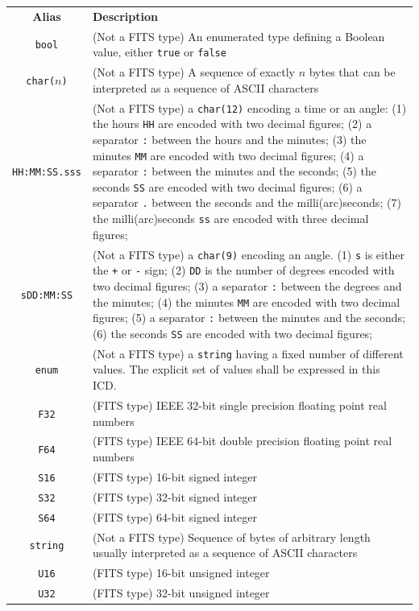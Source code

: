 \documentclass[panstarrs,spec]{panstarrs}
\begin{document}
{\centering%
  \begin{longtable}{|cp{5in}|}
    \hline
    \textbf{Alias} & \textbf{Description} \\
    \texttt{bool} & (Not a FITS type) An enumerated type defining a Boolean
    value, either \texttt{true} or \texttt{false}\\
    \texttt{char($n$)} & (Not a FITS type) A sequence of exactly $n$ bytes that
    can be interpreted
    as a sequence of ASCII characters\\
    \texttt{HH:MM:SS.sss} & (Not a FITS type) a \texttt{char(12)} encoding
    a time or an angle: (1) the hours \texttt{HH} are encoded with two
    decimal figures; (2) a separator \texttt{:} between the hours and
    the minutes; (3) the minutes \texttt{MM} are encoded with two
    decimal figures; (4) a separator \texttt{:} between the minutes
    and the seconds; (5) the seconds \texttt{SS} are encoded with two
    decimal figures; (6) a separator \texttt{.} between the seconds
    and the milli(arc)seconds; (7)
    the milli(arc)seconds \texttt{ss} are encoded with three decimal figures; \\
    \texttt{sDD:MM:SS} & (Not a FITS type) a \texttt{char(9)} encoding an
    angle. (1) \texttt{s} is either the \texttt{+} or \texttt{-} sign;
    (2) \texttt{DD} is the number of degrees encoded with two decimal
    figures; (3) a separator \texttt{:} between the degrees and the
    minutes; (4) the minutes \texttt{MM} are encoded with two decimal
    figures; (5) a separator \texttt{:} between the minutes and the
    seconds; (6) the
    seconds \texttt{SS} are encoded with two decimal figures;\\
    \texttt{enum} & (Not a FITS type) a \texttt{string} having a fixed number of
    different values. The explicit set of values shall be expressed in
    this ICD.\\
    \texttt{F32} & (FITS type) IEEE 32-bit single precision floating point real numbers \\
    \texttt{F64} & (FITS type) IEEE 64-bit double precision floating point real numbers \\
    \texttt{S16} & (FITS type) 16-bit signed integer \\
    \texttt{S32} & (FITS type) 32-bit signed integer \\
    \texttt{S64} & (FITS type) 64-bit signed integer \\
    \texttt{string} & (Not a FITS type) Sequence of bytes of arbitrary length 
    usually interpreted as a sequence of ASCII characters \\
    \texttt{U16} & (FITS type) 16-bit unsigned integer \\
    \texttt{U32} & (FITS type) 32-bit unsigned integer \\
    \hline
  \end{longtable}
}
\end{document}
